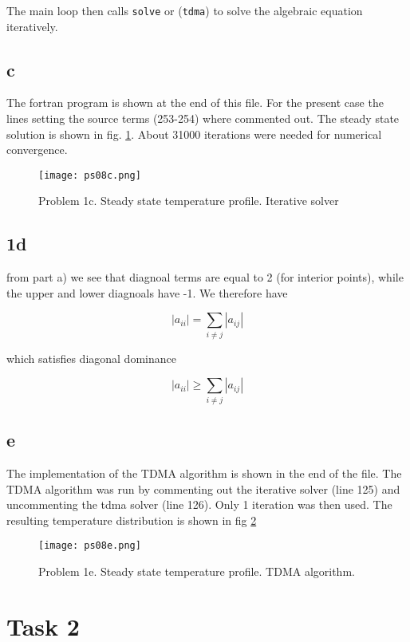 \documentclass{article}
\begin{document}
The main loop then calls \texttt{solve} or (\texttt{tdma}) to solve the algebraic equation iteratively.	

\subsection{c}
The fortran program is shown at the end of this file. For the present case the lines setting the source terms (253-254) where commented out. The steady state solution is shown in fig. \ref{fig:1c}. About 31000 iterations were needed for numerical convergence.

\begin{figure}
\texttt{[image: ps08c.png]}
\caption{Problem 1c. Steady state temperature profile. Iterative solver}
\label{fig:1c}
\end{figure}

\subsection{1d}
from part a) we see that diagnoal terms are equal to 2 (for interior points), while the upper and lower diagnoals have -1. We therefore have

\begin{equation}
|a_{ii}| = \sum_{i\neq j} |a_{ij}|
\end{equation}

which satisfies diagonal dominance

\begin{equation}
|a_{ii}| \geq \sum_{i\neq j} |a_{ij}|
\end{equation}

\subsection{e}
The implementation of the TDMA algorithm is shown in the end of the file. The TDMA algorithm was run by commenting out the iterative solver (line 125) and uncommenting the tdma solver (line 126). Only 1 iteration was then used. The resulting temperature distribution is shown in fig \ref{fig:1e}

\begin{figure}
\texttt{[image: ps08e.png]}
\caption{Problem 1e. Steady state temperature profile. TDMA algorithm.}
\label{fig:1e}
\end{figure}

\section{Task 2}
\end{document}
